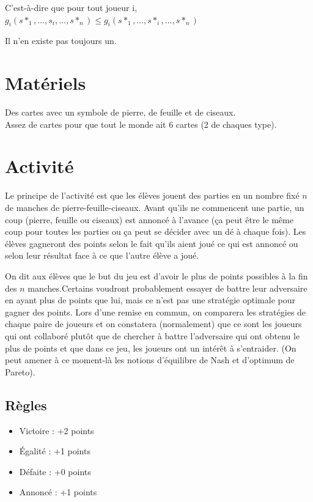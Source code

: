 \documentclass{article}
\begin{document}
C'est-à-dire que pour tout joueur i, $g_i(s*_1, ..., s_i, ..., s*_n) \leq g_i(s*_1, ..., s*_i, ..., s*_n)$

Il n'en existe pas toujours un.

\section{Matériels}
Des cartes avec un symbole de pierre, de feuille et de ciseaux. \\
Assez de cartes pour que tout le monde ait 6 cartes (2 de chaques type).
\newpage
\section{Activité}

Le principe de l'activité est que les élèves jouent des parties en un nombre fixé $n$ de manches de pierre-feuille-ciseaux. Avant qu'ils ne commencent une partie, un coup (pierre, feuille ou ciseaux) est annoncé à l'avance (ça peut être le même coup pour toutes les parties ou ça peut se décider avec un dé à chaque fois). Les élèves gagneront des points selon le fait qu'ils aient joué ce qui est annoncé ou selon leur résultat face à ce que l'autre élève a joué.

On dit aux élèves que le but du jeu est d'avoir le plus de points possibles à la fin des $n$ manches.Certains voudront probablement essayer de battre leur adversaire en ayant plus de points que lui, mais ce n'est pas une stratégie optimale pour gagner des points. Lors d'une remise en commun, on comparera les stratégies de chaque paire de joueurs et on constatera (normalement) que ce sont les joueurs qui ont collaboré plutôt que de chercher à battre l'adversaire qui ont obtenu le plus de points et que dans ce jeu, les joueurs ont un intérêt à s'entraider. (On peut amener à ce moment-là les notions d'équilibre de Nash et d'optimum de Pareto).

\subsection{Règles}
\begin{itemize}
    \item Victoire : +2 points
    \item Égalité : +1 points
    \item Défaite : +0 points
    \item Annoncé : +1 points
\end{itemize}
\end{document}
